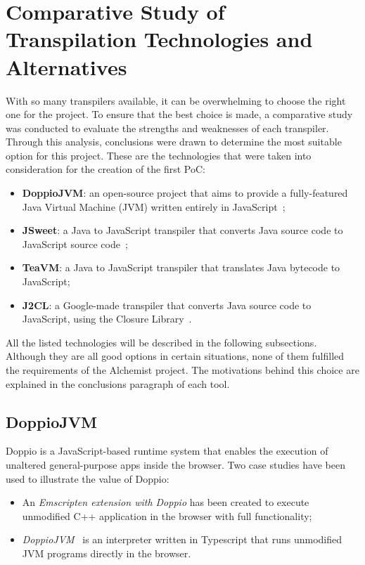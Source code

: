 \section{Comparative Study of Transpilation Technologies and Alternatives}
\label{sec:comparative-study-of-transpilation-technologies-and-alternatives}
With so many transpilers available, it can be overwhelming to choose the right one for the project.  To ensure that the best choice is made, a comparative study was conducted to evaluate the strengths and weaknesses of each transpiler.  Through this analysis, conclusions were drawn to determine the most suitable option for this project. These are the technologies that were taken into consideration for the creation of the first PoC:
\begin{itemize}
	\item \textbf{DoppioJVM}: an open-source project that aims to provide a fully-featured Java Virtual Machine (JVM) written entirely in JavaScript~\cite{DoppioJV33:online};
	\item \textbf{JSweet}: a Java to JavaScript transpiler that converts Java source code to JavaScript source code~\cite{JSweetat88:online};
	\item \textbf{TeaVM}: a Java to JavaScript transpiler that translates Java bytecode to JavaScript;
	\item \textbf{J2CL}: a Google-made transpiler that converts Java source code to JavaScript, using the Closure Library~\cite{googlej257:online}.
\end{itemize}
All the listed technologies will be described in the following subsections. Although they are all good options in certain situations, none of them fulfilled the requirements of the Alchemist project. The motivations behind this choice are explained in the conclusions paragraph of each tool.
\subsection{DoppioJVM}
\label{ssec:doppiojvm}
Doppio is a JavaScript-based runtime system that enables the execution of unaltered general-purpose apps inside the browser. Two case studies have been used to illustrate the value of Doppio:
\begin{itemize}
	\item An \emph{Emscripten extension with Doppio} has been created to execute unmodified C++ application in the browser with full functionality;
	\item \emph{DoppioJVM}~\cite{DoppioJV33:online} is an interpreter written in Typescript that runs unmodified JVM programs directly in the browser.
\end{itemize}

